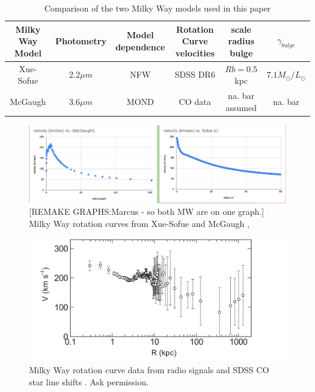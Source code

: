 \documentclass[reprint,%
 amsmath,amssymb,
 aps,
]{revtex4-1}
\begin{document}
  
  \begin{table}[]
      \centering
       \caption{Comparison of the two Milky Way models used in this paper}
      \label{tab:MWcompare}
       \begin{tabular}{|c|c|c|c|c|c|}
      \hline
        Milky Way Model & Photometry                        & Model dependence  & Rotation Curve velocities & scale radius bulge &$\gamma_{bulge}$\\
 \hline
Xue-Sofue     
&  2.2$ \mu m$
& NFW \cite{1996ApJ...462..563N}     
&SDSS DR6  \cite{Xue}       
& $Rb = 0.5$ kpc    
&$  7.1 M_\odot /L_\odot$  \\
  \hline
 McGaugh       
 & 3.6$\mu m$ 
 &MOND \cite{Milgrom}
 & CO data  \cite{2006ApJ...641..938L}                            
 &  na. bar assumed
 & na. bar\\
         \hline
      \end{tabular}
     
  \end{table}
  

  
  \begin{figure}
    \centering
    \includegraphics[width=\linewidth]{figures/MWXueSofueVMcGaugh.png}
    \caption{[REMAKE GRAPHS:Marcus - so both MW are on one graph.] Milky Way rotation curves
   from Xue-Sofue and McGaugh \cite{sofue2009unified}, \cite{McGaugh_2019} }
    \label{fig:mwSofuevMcGaugh}
\end{figure}

 \begin{figure}
    \centering
    \includegraphics[width=\linewidth]{Sofue_MWtoLGData}
    \caption{ Milky Way rotation curve data from radio signals and SDSS CO star line shifts  \cite{Sof11}. Ask permission.}
    \label{fig:mwSofue}
\end{figure}
\end{document}

